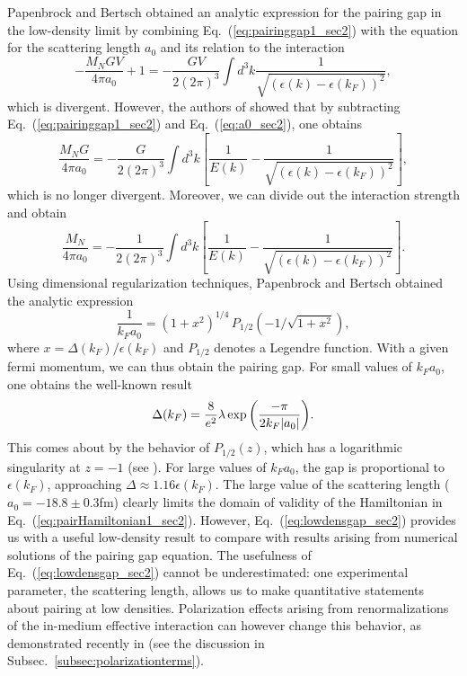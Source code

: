 \documentclass[rmp,aps,floatfix]{revtex4}
\begin{document}
Papenbrock and Bertsch \cite{pb98} obtained an analytic
expression for the pairing gap in the low-density limit
by combining Eq.~(\ref{eq:pairinggap1_sec2}) with the 
equation for the scattering length $a_0$ and its relation
to the interaction
\begin{equation}
    -\frac{M_NGV}{4\pi a_0}+1 = -\frac{GV}{2(2\pi)^3} 
     \int d^3k\frac{1}{\sqrt{(\epsilon(k)-\epsilon(k_F))^2}},
     \label{eq:a0_sec2}
\end{equation}
which is divergent. However, the authors of \cite{pb98}
showed that by subtracting Eq.~(\ref{eq:pairinggap1_sec2})
and Eq.~(\ref{eq:a0_sec2}), one obtains 
\begin{equation}
\frac{M_NG}{4\pi a_0} = - \frac{G}{2 (2\pi)^3} 
\int d^3k\left[\frac{1}{E(k)}-\frac{1}
{\sqrt{(\epsilon(k)-\epsilon(k_F))^2}}\right],
\end{equation}
which is no longer divergent. Moreover, we can divide out the 
interaction strength and obtain 
\begin{equation}
\frac{M_N}{4\pi a_0} = - \frac{1}{2 (2\pi)^3} 
\int d^3k\left[\frac{1}{E(k)}-\frac{1}
{\sqrt{(\epsilon(k)-\epsilon(k_F))^2}}\right].
\end{equation}
Using dimensional regularization techniques, Papenbrock and Bertsch
\cite{pb98} obtained the analytic expression
\begin{equation}
      \frac{1}{k_F a_0} = (1+x^2)^{1/4} \,P_{1/2}\left(-1/\sqrt{1+x^2}\right),
\end{equation}
where $x=\Delta(k_F)/\epsilon(k_F)$ and $P_{1/2}$ 
denotes a Legendre function. 
With a given fermi momentum, we can thus obtain the 
pairing gap. For small values of $k_F a_0$,
one obtains the well-known result \cite{gorkovmelik,kkc96}
\begin{equation}
    \label{eq:lowdensgap_sec2}
    \Delta(k_F) = {8\over e^2}\lambda\exp{\left(-\pi\over 2 k_F |a_0|\right)}.
\end{equation}
This comes about by the behavior of $P_{1/2}(z)$,
which has a logarithmic singularity at $z=-1$ (see \cite{pb98x}).
For large values of $k_Fa_0$, the gap is proportional 
to $\epsilon(k_F)$, approaching
$\Delta\approx 1.16\epsilon(k_F)$.
The large value of the scattering length ($a_0=-18.8 \pm 0.3$fm)
clearly limits the domain of validity of the Hamiltonian 
in Eq.~(\ref{eq:pairHamiltonian1_sec2}).
However, Eq.~(\ref{eq:lowdensgap_sec2}) provides us with a useful
low-density result to compare with results arising from numerical
solutions of the pairing gap equation. 
The usefulness of Eq.~(\ref{eq:lowdensgap_sec2}) cannot be underestimated:
one experimental parameter, the scattering length, allows us to make
quantitative statements about pairing at low densities. Polarization 
effects arising from renormalizations of the in-medium effective interaction
can however change this behavior, as demonstrated recently 
in \cite{henning2000,spr2001} (see the discussion in 
Subsec.~\ref{subsec:polarizationterms}).
\end{document}
